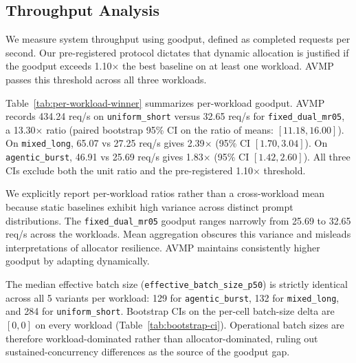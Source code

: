 \subsection{Throughput Analysis}
\label{sec:eval:throughput}

We measure system throughput using goodput, defined as completed requests per second. Our pre-registered protocol dictates that dynamic allocation is justified if the goodput exceeds 1.10$\times$ the best baseline on at least one workload. AVMP passes this threshold across all three workloads.

Table~\ref{tab:per-workload-winner} summarizes per-workload goodput. AVMP records 434.24 req/s on \texttt{uniform\_short} versus 32.65 req/s for \texttt{fixed\_dual\_mr05}, a 13.30$\times$ ratio (paired bootstrap 95\% CI on the ratio of means: $[11.18, 16.00]$). On \texttt{mixed\_long}, 65.07 vs 27.25 req/s gives 2.39$\times$ (95\% CI $[1.70, 3.04]$). On \texttt{agentic\_burst}, 46.91 vs 25.69 req/s gives 1.83$\times$ (95\% CI $[1.42, 2.60]$). All three CIs exclude both the unit ratio and the pre-registered 1.10$\times$ threshold.

\begin{table}[t]
\centering
\caption{Per-workload goodput, AVMP vs the best static baseline ($\uparrow$ higher is better). Goodput columns are mean req/s across the 12-cell (model, pool, seed) grid; ratio is $g_{\mathrm{AVMP}} / g_{\mathrm{baseline}}$. AVMP wins all three: 13.30$\times$ on \texttt{uniform\_short} (95\% CI $[11.18, 16.00]$), 2.39$\times$ on \texttt{mixed\_long} ($[1.70, 3.04]$), 1.83$\times$ on \texttt{agentic\_burst} ($[1.42, 2.60]$); CIs from Table~\ref{tab:bootstrap-ci}. \textbf{Bold} = winner per row.}
\label{tab:per-workload-winner}

\end{table}

We explicitly report per-workload ratios rather than a cross-workload mean because static baselines exhibit high variance across distinct prompt distributions. The \texttt{fixed\_dual\_mr05} goodput ranges narrowly from 25.69 to 32.65 req/s across the workloads. Mean aggregation obscures this variance and misleads interpretations of allocator resilience. AVMP maintains consistently higher goodput by adapting dynamically.

The median effective batch size (\texttt{effective\_batch\_size\_p50}) is strictly identical across all 5 variants per workload: 129 for \texttt{agentic\_burst}, 132 for \texttt{mixed\_long}, and 284 for \texttt{uniform\_short}. Bootstrap CIs on the per-cell batch-size delta are $[0,0]$ on every workload (Table~\ref{tab:bootstrap-ci}). Operational batch sizes are therefore workload-dominated rather than allocator-dominated, ruling out sustained-concurrency differences as the source of the goodput gap.

